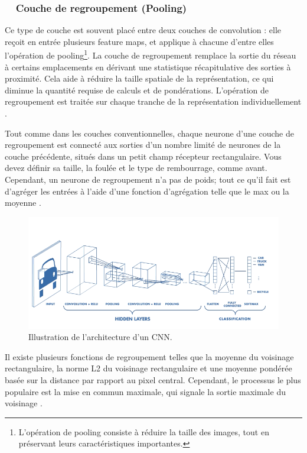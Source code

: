 \subsubsection*{\qquad \textbullet \ \ Couche de regroupement (Pooling)}
Ce type de couche est souvent placé entre deux couches de convolution : elle reçoit en entrée plusieurs feature maps, et applique à chacune d'entre elles l'opération de pooling\footnote{L'opération de pooling consiste à réduire la taille des images, tout en préservant leurs caractéristiques importantes.}. La couche de regroupement remplace la sortie du réseau à certains emplacements en dérivant une statistique récapitulative des sorties à proximité. Cela aide à réduire la taille spatiale de la représentation, ce qui diminue la quantité requise de calculs et de pondérations. L'opération de regroupement est traitée sur chaque tranche de la représentation individuellement \cite{goodfellow2016deep}. 

Tout comme dans les couches conventionnelles, chaque neurone d'une couche de regroupement est connecté aux sorties d'un nombre limité de neurones de la couche précédente, situés dans un petit champ récepteur rectangulaire. Vous devez définir sa taille, la foulée et le type de rembourrage, comme avant. Cependant, un neurone de regroupement n'a pas de poids; tout ce qu'il fait est d'agréger les entrées à l'aide d'une fonction d'agrégation telle que le max ou la moyenne \cite{geron2017hands}.

\begin{figure}[H]%
	\centering
	\includegraphics[width=\textwidth]{images/cnn_complet}
	\caption{Illustration de l'architecture d'un CNN.}
	\label{fig:cnn_complet}
\end{figure}

Il existe plusieurs fonctions de regroupement telles que la moyenne du voisinage rectangulaire, la norme L2 du voisinage rectangulaire et une moyenne pondérée basée sur la distance par rapport au pixel central. Cependant, le processus le plus populaire est la mise en commun maximale, qui signale la sortie maximale du voisinage \cite{goodfellow2016deep}.

